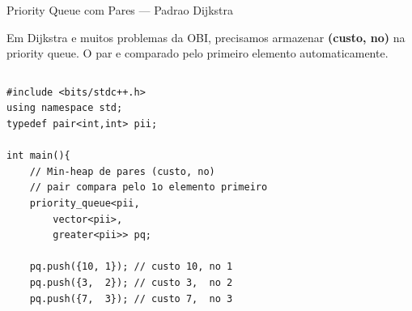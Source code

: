 \documentclass[aspectratio=169,11pt]{beamer}
\begin{document}
\begin{frame}[fragile,shrink=6]{Priority Queue com Pares --- Padrao Dijkstra}
  \begin{tcolorbox}[caixaAmarelo,title={Por que usar pares?}]
    \small
    Em Dijkstra e muitos problemas da OBI, precisamos armazenar
    \textbf{(custo, no)} na priority queue. O par e comparado pelo
    primeiro elemento automaticamente.
  \end{tcolorbox}
  \vspace{0.1cm}
  \begin{columns}[t]
      \begin{tcolorbox}[caixaCodigo]
        \begin{lstlisting}[style=cppsmall]
#include <bits/stdc++.h>
using namespace std;
typedef pair<int,int> pii;

int main(){
    // Min-heap de pares (custo, no)
    // pair compara pelo 1o elemento primeiro
    priority_queue<pii,
        vector<pii>,
        greater<pii>> pq;

    pq.push({10, 1}); // custo 10, no 1
    pq.push({3,  2}); // custo 3,  no 2
    pq.push({7,  3}); // custo 7,  no 3


\end{lstlisting}
\end{tcolorbox}
\end{columns}
\end{frame}
\end{document}
